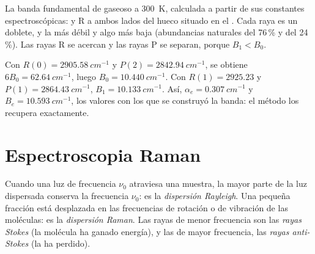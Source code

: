 \begin{omfigure}

{\small La banda fundamental de  gaseoso a \qty{300}{K}, calculada a partir de
sus constantes espectroscópicas:  y R a ambos lados del hueco situado en el
. Cada raya es un doblete,  y la más débil y algo más
baja  (abundancias naturales del 76\,\% y del 24\,\%). Las rayas R se acercan
y las rayas P se separan, porque $B_1 < B_0$.}
\end{omfigure}

\begin{example}\label{ex:b3:rovibrational-spectroscopy:analysis}
Con $R(0) = \qty{2905.58}{cm^{-1}}$ y $P(2) = \qty{2842.94}{cm^{-1}}$, se obtiene
$6B_0 = \qty{62.64}{cm^{-1}}$, luego $B_0 = \qty{10.440}{cm^{-1}}$. Con $R(1) = 2925.23$ y $P(1) =
\qty{2864.43}{cm^{-1}}$, $B_1 = \qty{10.133}{cm^{-1}}$. Así, $\alpha_e = \qty{0.307}{cm^{-1}}$
y $B_e = \qty{10.593}{cm^{-1}}$, los valores con los que se construyó la banda:
el método los recupera exactamente.
\end{example}

\section{Espectroscopia Raman}

\begin{definition}\label{def:b3:rovibrational-spectroscopy:raman}
Cuando una luz de frecuencia $\nu_0$ atraviesa una muestra, la mayor parte de la luz dispersada
conserva la frecuencia $\nu_0$: es la \emph{dispersión Rayleigh}.
Una pequeña fracción está desplazada en las frecuencias de rotación o de vibración
de las moléculas: es la \emph{dispersión Raman}.
Las rayas de menor frecuencia son las \emph{rayas Stokes} (la
molécula ha ganado energía), y las de mayor frecuencia, las \emph{rayas
anti-Stokes} (la ha perdido).
\end{definition}

